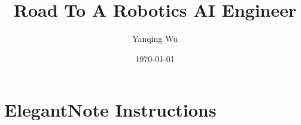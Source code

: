 \documentclass[lang=en,mode=geye,device=normal,color=blue,14pt]{elegantnote}
\title{Road To A Robotics AI Engineer}
\author{Yanqing Wu}
\institute{Viwistar Robotics}
\date{\today}
\begin{document}
\maketitle

\section{ElegantNote Instructions}
\thispagestyle{empty}

%

%
%
\end{document}
